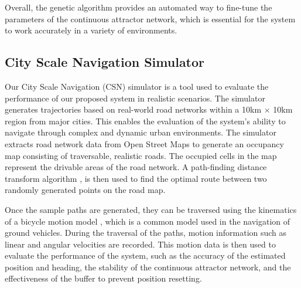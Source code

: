 Overall, the genetic algorithm provides an automated way to fine-tune the parameters of the continuous attractor network, which is essential for the system to work accurately in a variety of environments.



\subsection{City Scale Navigation Simulator}
\label{subsec:simulator}
Our City Scale Navigation (CSN) simulator is a tool used to evaluate the performance of our proposed system in realistic scenarios. The simulator generates trajectories based on real-world road networks within a 10km $\times$ 10km region from major cities. This enables the evaluation of the system's ability to navigate through complex and dynamic urban environments. The simulator extracts road network data from Open Street Maps to generate an occupancy map consisting of traversable, realistic roads. The occupied cells in the map represent the drivable areas of the road network. A path-finding distance transform algorithm \cite{corke2021not}, is then used to find the optimal route between two randomly generated points on the road map.

Once the sample paths are generated, they can be traversed using the kinematics of a bicycle motion model \cite{BicycleModel}, which is a common model used in the navigation of ground vehicles. During the traversal of the paths, motion information such as linear and angular velocities are recorded. This motion data is then used to evaluate the performance of the system, such as the accuracy of the estimated position and heading, the stability of the continuous attractor network, and the effectiveness of the buffer to prevent position resetting.
